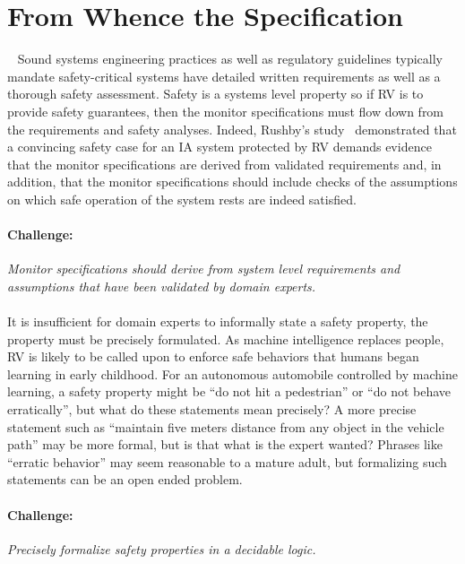 \section{From Whence the Specification}~\label{sec:req} Sound systems
engineering practices as well as regulatory guidelines typically
mandate safety-critical systems have detailed written requirements as
well as a thorough safety assessment. Safety is a systems level
property so if RV is to provide safety guarantees, then the monitor
specifications must flow down from the requirements and safety
analyses.  Indeed, Rushby's study~\cite{rvRushby,RushbyAIAA09}
demonstrated that a convincing safety case
for an IA system protected by RV demands evidence that the monitor
specifications are derived from validated requirements and, in
addition, that the monitor specifications should include checks of the
assumptions on which safe operation of the system rests are indeed
satisfied.

\paragraph{Challenge:} \emph{ Monitor specifications should derive from
  system level requirements and assumptions that have been validated
  by domain experts.} 


\paragraph{}It is insufficient for domain experts to informally state a safety
property, the property must be precisely formulated.  As machine
intelligence replaces people, RV is likely to be called upon to
enforce safe behaviors that humans began learning in early childhood.
For an autonomous automobile controlled by  machine learning, a
safety property might be ``do not hit a pedestrian'' or ``do not
behave erratically'', but what do these statements mean precisely?  A
more precise  statement such as ``maintain  five meters distance from any object
in the vehicle path'' may be more formal, but is that what is the
expert wanted?  Phrases like ``erratic behavior'' may seem reasonable 
to a mature adult, but formalizing such statements can be an open
ended problem.  

\paragraph{Challenge:} \emph{Precisely formalize safety properties  in
  a decidable logic.}


